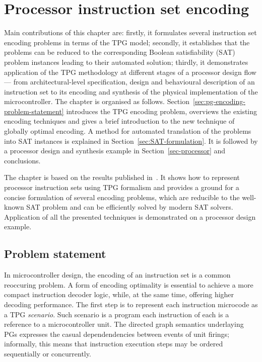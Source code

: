 
\chapter{Processor instruction set encoding}

Main contributions of this chapter are: firstly, it formulates several
instruction set encoding problems in terms of the TPG model; secondly,
it establishes that the problems can be reduced to the corresponding Boolean satisfiability (SAT) problem instances
leading to their automated solution; thirdly, it demonstrates application
of the TPG methodology at different stages of a processor design
flow --- from architectural-level specification, design and behavioural
description of an instruction set to its encoding and synthesis of
the physical implementation of the microcontroller. The chapter is organised
as follows. Section~\ref{sec:pg-encoding-problem-statement} introduces
the TPG encoding problem, overviews the existing encoding techniques and gives
a brief introduction to the new technique of globally optimal encoding.
A method for automated translation of the problems into SAT instances
is explained in Section~\ref{sec:SAT-formulation}. It is followed
by a processor design and synthesis example in Section~\ref{sec-processor} and
conclusions.

\label{chap:PGEncoding}

The chapter is based on the results published in~\cite{cpog_encoding}. It shows how to represent processor instruction sets using TPG formalism and provides
a ground for a concise formulation of several encoding problems, which
are reducible to the well-known SAT problem
and can be efficiently solved by modern SAT solvers. Application of
all the presented techniques is demonstrated on a processor design
example.



\section{Problem statement\label{sec:pg-encoding-problem-statement}}
In microcontroller design, the encoding of an instruction set is a common reoccuring problem. A form of encoding optimality is essential to achieve a more compact instruction decoder logic, while, at the same time, offering higher decoding performance. The first step is to represent each instruction microcode as a TPG \emph{scenario}. Such scenario is a program each instruction of each is a reference to a microcontroller unit. The directed graph semantics underlaying PGs expresses the casual dependendencies between events of unit firings; informally, this means that instruction execution steps may be ordered sequentially or concurrently.   


